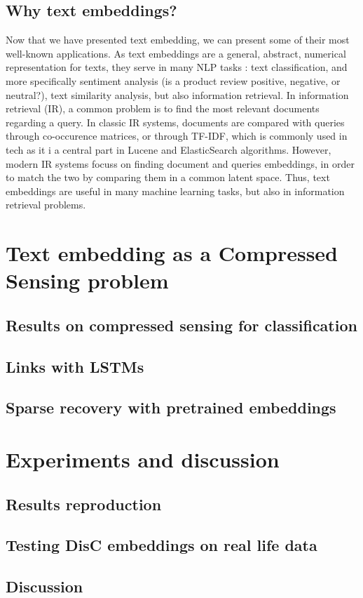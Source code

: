 \documentclass{article}
\begin{document}
\subsection{Why text embeddings? }


Now that we have presented text embedding, we can present some of 
their most well-known applications. As text embeddings 
are a general, abstract, numerical representation for texts, 
they serve in many NLP tasks : text classification, and 
more specifically sentiment analysis (is a product review positive, 
negative, or neutral?), text similarity analysis, but 
also information retrieval. In information retrieval (IR), 
a common problem is to find the most relevant documents 
regarding a query. In classic IR systems, documents are compared 
with queries through co-occurence matrices, or through TF-IDF, 
which is commonly used in tech as it i a central part in 
Lucene and ElasticSearch algorithms. However, modern IR 
systems focuss on finding document and queries embeddings, 
in order to match the two by comparing them in a common 
latent space. Thus, text embeddings are useful in many 
machine learning tasks, but also in information retrieval 
problems. 

\newpage
\section{Text embedding as a Compressed Sensing problem}

\subsection{Results on compressed sensing for classification}


\subsection{Links with LSTMs}

\subsection{Sparse recovery with pretrained embeddings}





\newpage
\section{Experiments and discussion}

\subsection{Results reproduction}

\subsection{Testing DisC embeddings on real life data}


\subsection{Discussion}



 

\end{document}
